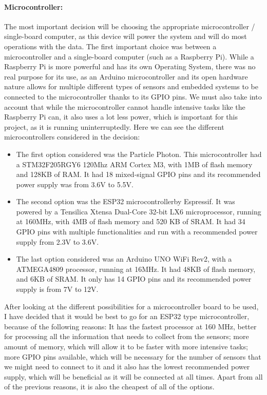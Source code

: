 \documentclass[12pt]{article}
\begin{document}
\paragraph*{Microcontroller:}
The most important decision will be choosing the appropriate microcontroller / single-board computer, as this device will power the system and will do most operations with the data. The first important choice was between a microcontroller and a single-board computer (such as a Raspberry Pi). While a Raspberry Pi is more powerful and has its own Operating System, there was no real purpose for its use, as an Arduino microcontroller and its open hardware nature allows for multiple different types of sensors and embedded systems to be connected to the microcontroller thanks to its GPIO pins. We must also take into account that while the microcontroller cannot handle intensive tasks like the Raspberry Pi can, it also uses a lot less power, which is important for this project, as it is running uninterruptedly. Here we can see the different microcontrollers considered in the decision:

\begin{itemize}
    \item The first option considered was the Particle Photon. This microcontroller had a STM32F205RGY6 120Mhz ARM Cortex M3, with 1MB of flash memory and 128KB of RAM. It had 18 mixed-signal GPIO pins and its recommended power supply was from 3.6V to 5.5V.
    \item The second option was the ESP32 microcontrollerby Espressif. It was powered by a Tensilica Xtensa Dual-Core 32-bit LX6 microprocessor, running at 160MHz, with 4MB of flash memory and 520 KB of SRAM. It had 34 GPIO pins with multiple functionalities and run with a recommended power supply from 2.3V to 3.6V.
    \item The last option considered was an Arduino UNO WiFi Rev2, with a ATMEGA4809 processor, running at 16MHz. It had 48KB of flash memory, and 6KB of SRAM. It only has 14 GPIO pins and its recommended power supply is from 7V to 12V. 
\end{itemize}

After looking at the different possibilities for a microcontroller board to be used, I have decided that it would be best to go for an ESP32 type microcontroller, because of the following reasons: It has the fastest processor at 160 MHz, better for processing all the information that needs to collect from the sensors; more amount of memory, which will allow it to be faster with more intensive tasks; more GPIO pins available, which will be necessary for the number of sensors that we might need to connect to it and it also has the lowest recommended power supply, which will be beneficial as it will be connected at all times. Apart from all of the previous reasons, it is also the cheapest of all of the options.
\end{document}
